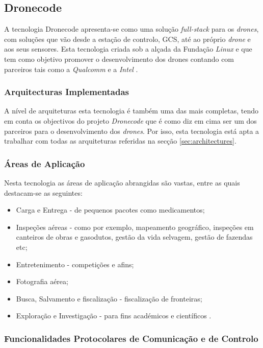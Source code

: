 \subsection{Dronecode}

A tecnologia Dronecode apresenta-se como uma solução \textit{full-stack} para os \textit{drones}, com soluções que vão desde a estação de controlo, GCS, até ao próprio \textit{drone} e aos seus sensores. Esta tecnologia criada sob a alçada da Fundação \textit{Linux} e que tem como objetivo promover o desenvolvimento dos drones contando com parceiros tais como a \textit{Qualcomm} e a \textit{Intel} \cite{DronecodeProject}.

\subsubsection{Arquitecturas Implementadas}

A nível de arquiteturas esta tecnologia é também uma das mais completas, tendo em conta os objectivos do projeto \textit{Dronecode} que é como diz em cima ser um dos parceiros para o desenvolvimento dos \textit{drones}. Por isso, esta tecnologia está apta a trabalhar com todas as arquiteturas referidas na secção \ref{sec:architectures}. 

\subsubsection{Áreas de Aplicação}

Nesta tecnologia as áreas de aplicação abrangidas são vastas, entre as quais destacam-se as seguintes:

\begin{itemize}
    \item Carga e Entrega - de pequenos pacotes como medicamentos;
    \item Inspeções aéreas - como por exemplo, mapeamento geográfico, inspeções em canteiros de obras e gasodutos, gestão da vida selvagem, gestão de fazendas etc;
    \item Entretenimento - competições e afins;
    \item Fotografia aérea;
    \item Busca, Salvamento e fiscalização - fiscalização de fronteiras;
    \item Exploração e Investigação - para fins académicos e científicos \cite{DronecodeProject}.
\end{itemize}

\subsubsection{Funcionalidades Protocolares de Comunicação e de Controlo}

